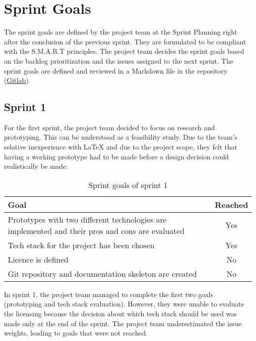 \section{Sprint Goals}\label{sec:sprint-goals}
The sprint goals are defined by the project team at the Sprint Planning right after the conclusion of the previous sprint.
They are formulated to be compliant with the S.M.A.R.T principles.
The project team decides the sprint goals based on the backlog
prioritization and the issues assigned to the next sprint.
The sprint goals are defined and reviewed in a Markdown file in the repository (\href{https://gitlab.ti.bfh.ch/decibel-threshold-event-displayer/decibel-threshold-event-displayer/-/blob/main/doc/scrum/sprints.md}{Gitlab}).

\subsection{Sprint 1}\label{subsec:sprint-1}
For the first sprint, the project team decided to focus on research and prototyping.
This can be understood as a feasibility study.
Due to the team's relative inexperience with LaTeX and due to the project scope, they felt that having a working prototype had to be
made before a design decision could realistically be made. \\
\begin{table}[H]
    \centering
    \begin{tabularx}{\textwidth}{X c}
        \toprule
        \textbf{Goal}                                                                                    & \textbf{Reached} \\
        \midrule
        Prototypes with two different technologies are implemented and their pros and cons are evaluated & Yes              \\
        \midrule
        Tech stack for the project has been chosen                                                       & Yes              \\
        \midrule
        Licence is defined                                                                               & No               \\
        \midrule
        Git repository and documentation skeleton are created                                            & No               \\
        \bottomrule
    \end{tabularx}
    \caption{Sprint goals of sprint 1}\label{tab:sprint_goals1}
\end{table}
In sprint 1, the project team managed to complete the first two goals (prototyping and tech stack evaluation).
However, they were unable to evaluate the licensing because the decision about which tech stack should be used was made only at the end of the sprint.
The project team underestimated the issue weights, leading to goals that were not reached.

